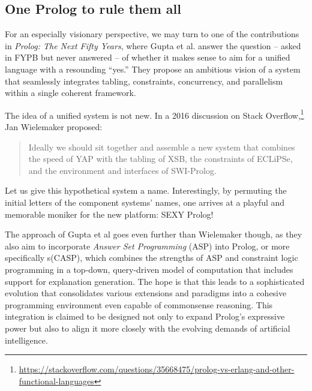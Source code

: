 \subsection{One Prolog to rule them all}

For an especially visionary perspective, we may turn to one of the contributions in \textit{Prolog: The Next Fifty Years}, where Gupta et al. answer the question -- asked in FYPB but never answered -- of whether it makes sense to aim for a unified language with a resounding ``yes.'' They propose an ambitious vision of a system that seamlessly integrates tabling, constraints, concurrency, and parallelism within a single coherent framework.



The idea of a unified system is not new. In a 2016 discussion on Stack Overflow,\footnote{\url{https://stackoverflow.com/questions/35668475/prolog-vs-erlang-and-other-functional-languages}} Jan Wielemaker proposed:

\begin{quote}
Ideally we should sit together and assemble a new system that combines the speed of YAP with the tabling of XSB, the constraints of ECLiPSe, and the environment and interfaces of SWI-Prolog.
\end{quote}

\noindent Let us give this hypothetical system a name. Interestingly, by permuting the initial letters of the component systems' names, one arrives at a playful and memorable moniker for the new platform: SEXY Prolog!

The approach of Gupta et al goes even further than Wielemaker though, as they also aim to incorporate \textit{Answer Set Programming} (ASP) into Prolog, or more specifically s(CASP), which combines the strengths of ASP and constraint logic programming in a top-down, query-driven model of computation that includes support for explanation generation. The hope is that this leads to a sophisticated evolution that consolidates various extensions and paradigms into a cohesive programming environment even capable of commonsense reasoning. This integration is claimed to be designed not only to expand Prolog's expressive power but also to align it more closely with the evolving demands of artificial intelligence. %


